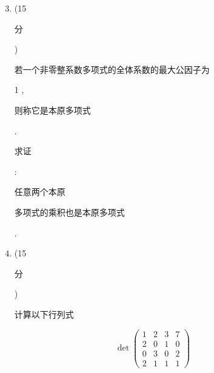 \documentclass[10pt]{article}
\begin{document}
\begin{enumerate}
  \setcounter{enumi}{2}
  \item (15 \begin{CJK}{UTF8}{mj}分\end{CJK}) \begin{CJK}{UTF8}{mj}若一个非零整系数多项式的全体系数的最大公因子为\end{CJK} 1 , \begin{CJK}{UTF8}{mj}则称它是本原多项式\end{CJK}. \begin{CJK}{UTF8}{mj}求证\end{CJK}: \begin{CJK}{UTF8}{mj}任意两个本原\end{CJK} \begin{CJK}{UTF8}{mj}多项式的乘积也是本原多项式\end{CJK}.

  \item (15 \begin{CJK}{UTF8}{mj}分\end{CJK}) \begin{CJK}{UTF8}{mj}计算以下行列式\end{CJK}

\end{enumerate}
$$
\operatorname{det}\left(\begin{array}{cccc}
1 & 2 & 3 & 7 \\
2 & 0 & 1 & 0 \\
0 & 3 & 0 & 2 \\
2 & 1 & 1 & 1
\end{array}\right)
$$
\end{document}
